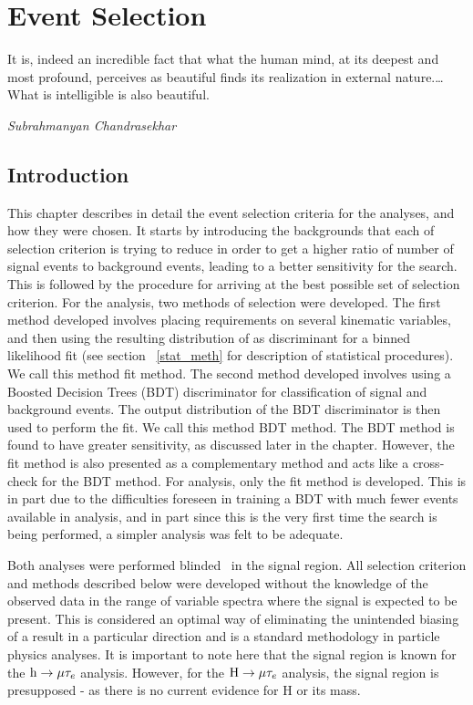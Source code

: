 \chapter{Event Selection}
\label{evt_sel}
\epigraph{It is, indeed an incredible fact that what the human mind, at its deepest and most profound, perceives as beautiful finds its realization in external nature.… What is intelligible is also beautiful.}{\textit{Subrahmanyan Chandrasekhar}}
\vskip 0.5in
\section{Introduction}
\label{evt_sel_intro}
This chapter describes in detail the event selection criteria for the analyses, and how they were chosen. It starts by introducing the backgrounds that each of selection criterion is trying to reduce in order to get a higher ratio of number of signal events to background events, leading to a better sensitivity for the search. This is followed by the procedure for arriving at the best possible set of selection criterion. For the \hmue analysis, two methods of selection were developed. The first method developed involves placing requirements on several kinematic variables, and then using the resulting distribution of \mcol as discriminant for a binned likelihood fit (see section ~\ref{stat_meth} for description of statistical procedures). We call this method \mcol fit method. The second method developed involves using a Boosted Decision Trees (BDT) discriminator  for classification of signal and background events. The output distribution of the BDT discriminator is then used to perform the fit. We call this method BDT method. The BDT method is found to have greater sensitivity, as discussed later in the chapter. However, the \mcol fit method is also presented as a complementary method and acts like a cross-check for the BDT method. For \Hmue analysis, only the \mcol fit method is developed. This is in part due to the difficulties foreseen in training a BDT with much fewer events available in \Hmue analysis, and in part since this is the very first time the \Hmue search is being performed, a simpler analysis was felt to be adequate.  

Both analyses were performed blinded~\cite{blind_analysis} in the signal region. All selection criterion and methods described below were developed without the knowledge of the observed data in the range of variable spectra where the signal is expected to be present. This is considered an optimal way of eliminating the unintended biasing of a result in a particular direction and is a standard methodology in particle physics analyses. It is important to note here that the signal region is known for the $\text{h} \to \mu \tau_{e}$ analysis. However, for the $\text{H} \to \mu \tau_{e}$ analysis, the signal region is presupposed - as there is no current evidence for H or its mass.

